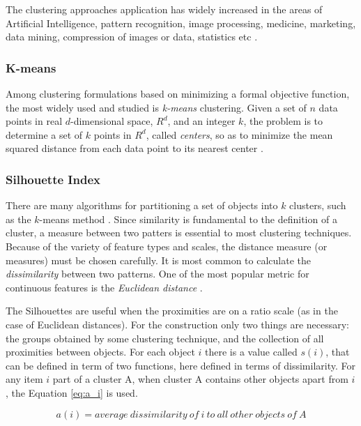 \documentclass[journal]{IEEEtran}
\begin{document}
The clustering approaches application has widely increased in the
areas of Artificial Intelligence, pattern recognition, image processing,
medicine, marketing, data mining, compression of images or data,
statistics etc \cite{ahalya2015data}.

\subsubsection{K-means}

Among clustering formulations based on minimizing a formal objective function, the most widely used and studied is \textit{k-means} clustering. Given a set of $n$ data points in real $d$-dimensional space, $R^d$, and an integer $k$, the problem is to determine a set of $k$ points in $R^d$, called \textit{centers}, so as to minimize the mean squared distance from each data point to its nearest center \cite{kanungo2002efficient}.

\subsubsection{Silhouette Index}

There are many algorithms for partitioning a set of objects into $k$ clusters, such as the $k$-means method \cite{kanungo2002efficient}. Since similarity is fundamental to the definition of a cluster, a measure between two patters is essential to most clustering techniques. Because of the variety of feature types and scales, the distance measure (or measures) must be chosen carefully. It is most common to calculate the \textit{dissimilarity} between two patterns. One of the most popular metric for continuous features is the \textit{Euclidean distance} \cite{jain1988algorithms}.

The Silhouettes are useful when the proximities are on a ratio scale (as in the case of Euclidean distances). For the construction only two things are necessary: the groups obtained by some clustering technique, and the collection of all proximities between objects. For each object $i$ there is a value called $s(i)$, that can be defined in term of two functions, here defined in terms of dissimilarity. For any item $i$ part of a cluster A, when cluster A contains other objects apart from $i$, the Equation \ref{eq:a_i} is used.

\begin{equation} \label{eq:a_i}
a(i) = average~dissimilarity~of~i~to~all~other~objects~of~A
\end{equation}
\end{document}
